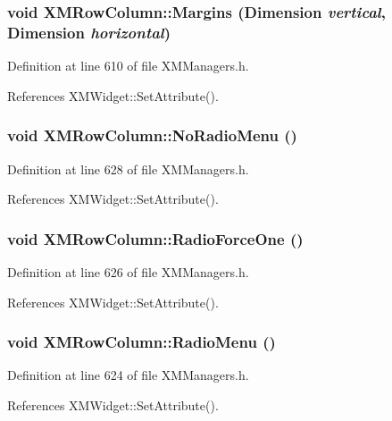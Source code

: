 \subsubsection{\setlength{\rightskip}{0pt plus 5cm}void XMRow\-Column::Margins (Dimension {\em vertical}, Dimension {\em horizontal})\hspace{0.3cm}{\tt  [inline]}}\label{classXMRowColumn_a9}




Definition at line 610 of file XMManagers.h.

References XMWidget::Set\-Attribute().
\subsubsection{\setlength{\rightskip}{0pt plus 5cm}void XMRow\-Column::No\-Radio\-Menu ()\hspace{0.3cm}{\tt  [inline]}}\label{classXMRowColumn_a15}




Definition at line 628 of file XMManagers.h.

References XMWidget::Set\-Attribute().
\subsubsection{\setlength{\rightskip}{0pt plus 5cm}void XMRow\-Column::Radio\-Force\-One ()\hspace{0.3cm}{\tt  [inline]}}\label{classXMRowColumn_a14}




Definition at line 626 of file XMManagers.h.

References XMWidget::Set\-Attribute().
\subsubsection{\setlength{\rightskip}{0pt plus 5cm}void XMRow\-Column::Radio\-Menu ()\hspace{0.3cm}{\tt  [inline]}}\label{classXMRowColumn_a13}




Definition at line 624 of file XMManagers.h.

References XMWidget::Set\-Attribute().
